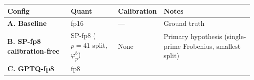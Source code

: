 \documentclass[
  11pt,
]{article}
\begin{document}
\begin{longtable}[]{@{}llll@{}}
\toprule
\begin{minipage}[b]{0.22\columnwidth}\raggedright
Config\strut
\end{minipage} & \begin{minipage}[b]{0.22\columnwidth}\raggedright
Quant\strut
\end{minipage} & \begin{minipage}[b]{0.22\columnwidth}\raggedright
Calibration\strut
\end{minipage} & \begin{minipage}[b]{0.22\columnwidth}\raggedright
Notes\strut
\end{minipage}\tabularnewline
\midrule
\endhead
\begin{minipage}[t]{0.22\columnwidth}\raggedright
\textbf{A. Baseline}\strut
\end{minipage} & \begin{minipage}[t]{0.22\columnwidth}\raggedright
fp16\strut
\end{minipage} & \begin{minipage}[t]{0.22\columnwidth}\raggedright
---\strut
\end{minipage} & \begin{minipage}[t]{0.22\columnwidth}\raggedright
Ground truth\strut
\end{minipage}\tabularnewline
\begin{minipage}[t]{0.22\columnwidth}\raggedright
\textbf{B. SP-fp8 calibration-free}\strut
\end{minipage} & \begin{minipage}[t]{0.22\columnwidth}\raggedright
SP-fp8 (\(p = 41\) split, \(\varphi_p^8\))\strut
\end{minipage} & \begin{minipage}[t]{0.22\columnwidth}\raggedright
None\strut
\end{minipage} & \begin{minipage}[t]{0.22\columnwidth}\raggedright
Primary hypothesis (single-prime Frobenius, smallest split)\strut
\end{minipage}\tabularnewline
\begin{minipage}[t]{0.22\columnwidth}\raggedright
\textbf{C. GPTQ-fp8}\strut
\end{minipage} & \begin{minipage}[t]{0.22\columnwidth}\raggedright
fp8\strut
\end{minipage} & \begin{minipage}[t]{0.22\columnwidth}\raggedright

\end{minipage}
\end{longtable}
\end{document}
